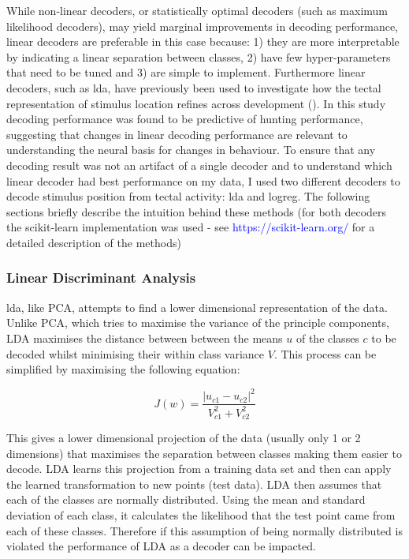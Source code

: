 While non-linear decoders, or statistically optimal decoders (such as maximum likelihood decoders), may yield marginal improvements in decoding performance, linear decoders are preferable in this case because: 1) they are more interpretable by indicating a linear separation between classes, 2) have few hyper-parameters that need to be tuned and 3) are simple to implement. Furthermore linear decoders, such as \gls{lda}, have previously been used to investigate how the tectal representation of stimulus location refines across development (\cite{Avitan2019}). In this study decoding performance was found to be predictive of hunting performance, suggesting that changes in linear decoding performance are relevant to understanding the neural basis for changes in behaviour. To ensure that any decoding result was not an artifact of a single decoder and to understand which linear decoder had best performance on my data, I used two different decoders to decode stimulus position from tectal activity: \gls{lda} and \gls{logreg}. The following sections briefly describe the intuition behind these methods (for both decoders the scikit-learn implementation was used -  see \textcolor{blue}{https://scikit-learn.org/} for a detailed description of the methods)


\subsubsection{Linear Discriminant Analysis}
\gls{lda}, like PCA, attempts to find a lower dimensional representation of the data. Unlike PCA, which tries to maximise the variance of the principle components, LDA maximises the distance between between the means $u$ of the classes $c$ to be decoded whilst minimising their within class variance $V$. This process can be simplified by maximising the following equation: 

\begin{equation}
    J(w) = \frac{| u_{c1} - u_{c2}|^{2}}{V_{c1}^{2} + V_{c2}^{2}}
\end{equation}

This gives a lower dimensional projection  of the data  (usually only 1 or 2 dimensions) that maximises the separation between classes making them easier to decode. LDA learns this projection from a training data set and then can apply the learned transformation to new points (test data). LDA then assumes that each of the classes are normally distributed. Using the mean and standard deviation of each class, it calculates the likelihood that the test point came from each of these classes. Therefore if this assumption of being normally distributed is violated the performance of LDA as a decoder can be impacted.

